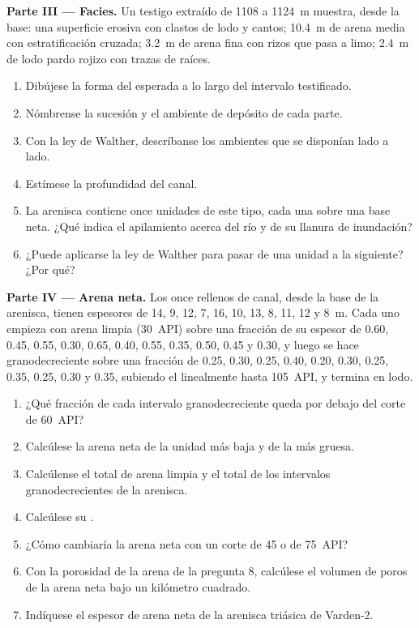 \begin{problem}
\medskip\noindent\textbf{Parte III --- Facies.} Un testigo extraído de 1108 a
\qty{1124}{m} muestra, desde la base: una superficie erosiva con clastos de lodo y
cantos; \qty{10.4}{m} de arena media con estratificación cruzada; \qty{3.2}{m} de arena fina con rizos
que pasa a limo; \qty{2.4}{m} de lodo pardo rojizo con trazas de raíces.
\begin{enumerate}[resume]
\item Dibújese la forma del  esperada a lo largo del intervalo testificado.
\item Nómbrense la sucesión y el ambiente de depósito de cada parte.
\item Con la ley de Walther, descríbanse los ambientes que se disponían lado a lado.
\item Estímese la profundidad del canal.
\item La arenisca contiene once unidades de este tipo, cada una sobre una base neta. ¿Qué
  indica el apilamiento acerca del río y de su llanura de inundación?
\item ¿Puede aplicarse la ley de Walther para pasar de una unidad a la siguiente? ¿Por qué?
\end{enumerate}

\medskip\noindent\textbf{Parte IV --- Arena neta.} Los once rellenos de canal,
desde la base de la arenisca, tienen espesores de 14, 9, 12, 7, 16, 10, 13, 8, 11, 12 y
\qty{8}{m}. Cada uno empieza con arena limpia (\qty{30}{API}) sobre una fracción
de su espesor de 0.60, 0.45, 0.55, 0.30, 0.65, 0.40, 0.55, 0.35, 0.50,
0.45 y 0.30, y luego se hace granodecreciente sobre una fracción de 0.25, 0.30, 0.25, 0.40,
0.20, 0.30, 0.25, 0.35, 0.25, 0.30 y 0.35, subiendo el  linealmente hasta
\qty{105}{API}, y termina en lodo.
\begin{enumerate}[resume]
\item ¿Qué fracción de cada intervalo granodecreciente queda por debajo del
  corte de \qty{60}{API}?
\item Calcúlese la arena neta de la unidad más baja y de la más gruesa.
\item Calcúlense el total de arena limpia y el total de los intervalos granodecrecientes de la
  arenisca.
\item Calcúlese su .
\item ¿Cómo cambiaría la arena neta con un corte de 45 o de
  \qty{75}{API}?
\item Con la porosidad de la arena de la pregunta 8, calcúlese el volumen de poros de la
  arena neta bajo un kilómetro cuadrado.
\item Indíquese el espesor de arena neta de la arenisca triásica de Varden-2.
\end{enumerate}
\end{problem}
